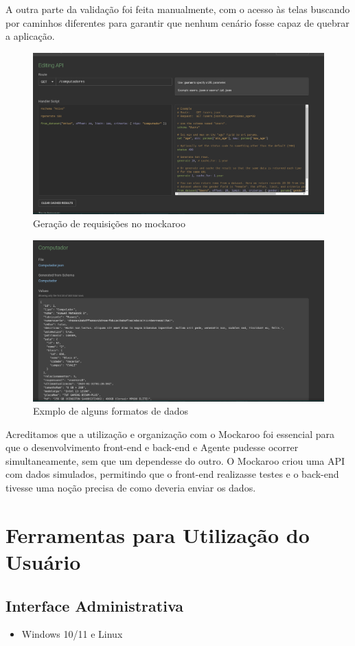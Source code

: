 A outra parte da validação foi feita manualmente, com o acesso às telas buscando por caminhos diferentes para garantir que nenhum cenário fosse capaz de quebrar a aplicação.

\begin{figure}[H]
    \centering
    \includegraphics[width=0.6\linewidth]{figuras/apicomputador.png}
    \caption{Geração de requisições no mockaroo}
    \label{fig:enter-label}
\end{figure}

\begin{figure}[H]
    \centering
    \includegraphics[width=0.6\linewidth]{figuras/mockcomputador.png}
    \caption{Exmplo de alguns formatos de dados}
    \label{fig:enter-label}
\end{figure}

Acreditamos que a utilização e organização com o Mockaroo foi essencial para que o desenvolvimento front-end e back-end e Agente pudesse ocorrer simultaneamente, sem que um dependesse do outro. O Mockaroo criou uma API com dados simulados, permitindo que o front-end realizasse testes e o back-end tivesse uma noção precisa de como deveria enviar os dados.

\section{Ferramentas para Utilização do Usuário}
\subsection{Interface Administrativa}
\begin{itemize}
\item Windows 10/11 e Linux
\end{itemize}
